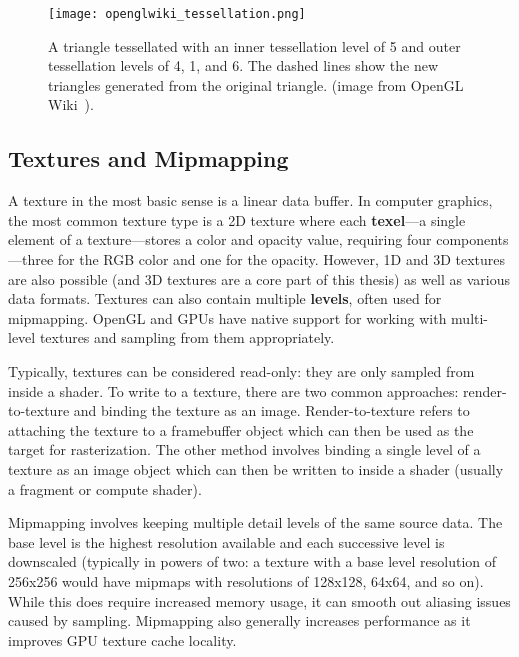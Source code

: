 \begin{figure}[h]
\centering
\texttt{[image: openglwiki\_tessellation.png]}
\caption{A triangle tessellated with an inner tessellation level of 5 and outer tessellation levels of 4, 1, and 6. The dashed lines show the new triangles generated from the original triangle. (image from OpenGL Wiki~\cite{openglwiki_tessellation}).}
\label{fig:tessellation}
\end{figure}

\subsection{Textures and Mipmapping}
A texture in the most basic sense is a linear data buffer. In computer graphics, the most common texture type is a 2D texture where each \textbf{texel}---a single element of a texture---stores a color and opacity value, requiring four components---three for the RGB color and one for the opacity. However, 1D and 3D textures are also possible (and 3D textures are a core part of this thesis) as well as various data formats. Textures can also contain multiple \textbf{levels}, often used for mipmapping. OpenGL and GPUs have native support for working with multi-level textures and sampling from them appropriately.

Typically, textures can be considered read-only: they are only sampled from inside a shader. To write to a texture, there are two common approaches: render-to-texture and binding the texture as an image. Render-to-texture refers to attaching the texture to a framebuffer object which can then be used as the target for rasterization. The other method involves binding a single level of a texture as an image object which can then be written to inside a shader (usually a fragment or compute shader).

Mipmapping involves keeping multiple detail levels of the same source data. The base level is the highest resolution available and each successive level is downscaled (typically in powers of two: a texture with a base level resolution of 256x256 would have mipmaps with resolutions of 128x128, 64x64, and so on). While this does require increased memory usage, it can smooth out aliasing issues caused by sampling. Mipmapping also generally increases performance as it improves GPU texture cache locality.



